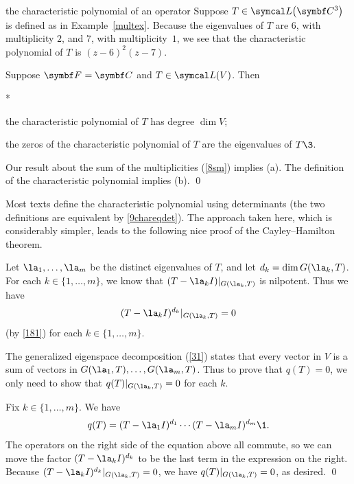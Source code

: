 \begin{example}[multex2]{the characteristic polynomial of an operator}
Suppose $T \in \L\paren[\big]{\C3}$ is defined as in Example~\ref{multex}. Because the eigenvalues of $T$ are $6$, with multiplicity $2$, and $7$, with multiplicity~$1$, we see that the characteristic polynomial of $T$ is $(z-6)^2 (z-7)$.
\end{example}

{Suppose $\F{} = \C{}$ and $T \in \L(V)$. Then
\begin{subtheorem}*
\item
the characteristic polynomial of $T$ has degree $\dim V$;
\item
the zeros of the characteristic polynomial of $T$ are the eigenvalues of $T\3$.
\end{subtheorem}}

\proof
Our result about the sum of the multiplicities (\ref{8sm}) implies (a). The definition of the characteristic polynomial implies (b).
\qed

Most texts define the characteristic polynomial  using determinants (the two definitions are equivalent by \ref{9chareqdet}).  The approach  taken here, which is considerably simpler, leads to the following nice proof of the Cayley--Hamilton theorem.


\proof
Let $\la_1, \dots, \la_m$ be the distinct eigenvalues of $T$, and let $d_k = \dim G(\la_k, T)$. For each $k \in \{1, \dots, m\}$, we know that $(T - \la_k I)|_{G(\la_k, T)}$ is nilpotent. Thus we have
\vspace{-6bp}
\[
(T - \la_k I)^{d_k}|_{G(\la_k, T)} = 0
\]
(by \ref{181}) for each $k \in \{1, \dots, m\}$.

The generalized eigenspace decomposition (\ref{31}) states that every vector in $V$ is a sum of vectors in $G(\la_1, T), \dots, G(\la_m, T)$. Thus to prove that $q(T) = 0$, we only need to show that \mbox{$q(T)|_{G(\la_k, T)} = 0$} for each $k$.

Fix $k \in \{1, \dots, m\}$. We have
\[
q(T) = (T - \la_1 I)^{d_1} \dotsm (T - \la_m I)^{d_m}\1.
\]
The operators on the right side of the equation above all commute, so we can move the factor $(T - \la_k I)^{d_k}$ to be the last term in the expression on the right. Because $(T - \la_k I)^{d_k}|_{G(\la_k, T)} = 0$, we have $q(T)|_{G(\la_k, T)} = 0$, as desired.
\qed

